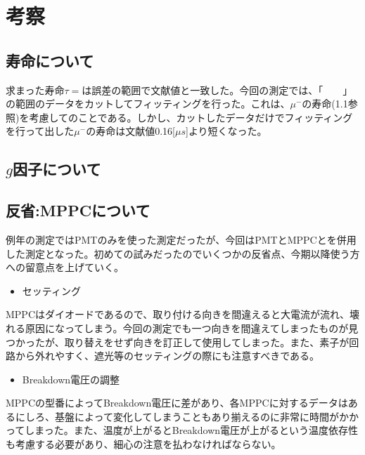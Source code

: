 \section{考察}
\subsection{寿命について}
求まった寿命$\tau=  $は誤差の範囲で文献値と一致した。今回の測定では、「　　」の範囲のデータをカットしてフィッティングを行った。これは、$\mu^-$の寿命(1.1参照)を考慮してのことである。しかし、カットしたデータだけでフィッティングを行って出した$\mu^-$の寿命は文献値0.16[$\mu s$]より短くなった。

\subsection{$g$因子について}



\subsection{反省:MPPCについて}
例年の測定ではPMTのみを使った測定だったが、今回はPMTとMPPCとを併用した測定となった。初めての試みだったのでいくつかの反省点、今期以降使う方への留意点を上げていく。
\begin{itemize}
\item セッティング
\end{itemize}
MPPCはダイオードであるので、取り付ける向きを間違えると大電流が流れ、壊れる原因になってしまう。今回の測定でも一つ向きを間違えてしまったものが見つかったが、取り替えをせず向きを訂正して使用してしまった。また、素子が回路から外れやすく、遮光等のセッティングの際にも注意すべきである。
\begin{itemize}
\item Breakdown電圧の調整
\end{itemize}
MPPCの型番によってBreakdown電圧に差があり、各MPPCに対するデータはあるにしろ、基盤によって変化してしまうこともあり‎揃えるのに非常に時間がかかってしまった。また、温度が上がるとBreakdown電圧が上がるという温度依存性も考慮する必要があり、細心の注意を払わなければならない。

